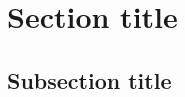 \documentclass[a4paper,11pt,oneside]{book}
\begin{document}
			\section{Section title}
			\subsection {Subsection title}
			
			
			
			
			
			
			
			{}
			
			
			
\end{document}
